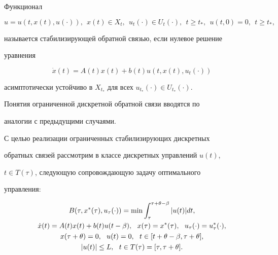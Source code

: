 \begin{defns}


Функционал


$$


u=u(t, x(t), u(\cdot)),\ \ x(t) \in X_t,\ \ u_t(\cdot) \in U_t(\cdot),


\ \ t\ge t_*,\ \ u(t,0)=0,\ \ t \ge t_*,


$$


называется стабилизирующей обратной связью, если нулевое решение


уравнения


\begin{equation}\label{112}


\Dot x(t)=A(t)x(t)+b(t)u(t, x(t), u_{t}(\cdot))


\end{equation}


асимптотически устойчиво в $X_{t_*}$ для всех $u_{t_*}(\cdot)


\in U_{t_*}(\cdot)$.


\end{defns}





Понятия ограниченной дискретной обратной связи вводятся по


аналогии с предыдущими случаями.





С целью реализации ограниченных стабилизирующих дискретных


обратных связей рассмотрим в классе дискретных управлений $u(t)$,


$t\in T(\tau)$, следующую сопровождающую задачу оптимального


управления:


\begin{gather}


B(\tau, x^*(\tau), u_{\tau}(\cdot))=\min


\int_{\tau}^{\tau+\theta-\beta}|u(t)|dt, \notag \\


%


\label{113}


\Dot x(t)=A(t)x(t)+b(t)u(t-\beta),\ \ x(\tau)=x^*(\tau),


\ \ u_{\tau}(\cdot)=u^*_{\tau}(\cdot), \\


%


x(\tau+\theta)=0,\ \ u(t)=0,\ \ t \in [t+\theta-\beta, \tau+\theta],\notag\\


%


|u(t)| \le L,\ \ t \in T(\tau)=[\tau,\tau+\theta].\notag


\end{gather}





